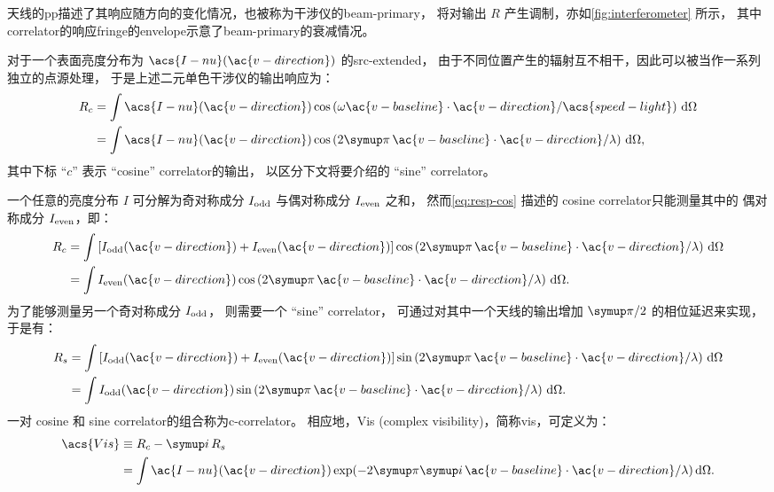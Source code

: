 天线的\ac{pp}描述了其响应随方向的变化情况，也被称为干涉仪的\acf{beam-primary}，
将对输出 $R$ 产生调制，亦如\autoref{fig:interferometer} 所示，
其中\ac{correlator}的响应\ac{fringe}的\ac{envelope}示意了\ac{beam-primary}的衰减情况。

对于一个表面亮度分布为 $\acs{I-nu}(\ac{v-direction})$ 的\ac{src-extended}，
由于不同位置产生的辐射互不相干，因此可以被当作一系列独立的点源处理，
于是上述二元单色干涉仪的输出响应为：
\begin{align}
  R_c & = \int \acs{I-nu}(\ac{v-direction})
      \cos \left( \omega \ac{v-baseline} \cdot \ac{v-direction} /
        \acs{speed-light} \right)
      \,\D{\Omega}  \\
    & = \int \acs{I-nu}(\ac{v-direction}) \cos \left(
        2\Cpi\, \ac{v-baseline} \cdot \ac{v-direction} / \lambda \right)
      \,\D{\Omega} ,
    \label{eq:resp-cos}
\end{align}
其中下标 \enquote{$c$} 表示 \enquote{cosine} \ac{correlator}的输出，
以区分下文将要介绍的 \enquote{sine} \ac{correlator}。

一个任意的亮度分布 $I$ 可分解为奇对称成分 $I_{\mathrm{odd}}$
与偶对称成分 $I_{\mathrm{even}}$ 之和，
然而\autoref{eq:resp-cos} 描述的 cosine \ac{correlator}只能测量其中的
偶对称成分 $I_{\mathrm{even}}$，即：
\begin{align}
  R_c & = \int \left[ I_{\R{odd}}(\ac{v-direction}) +
        I_{\R{even}}(\ac{v-direction}) \right]
      \cos \left( 2\Cpi\, \ac{v-baseline} \cdot \ac{v-direction} /
        \lambda \right)
      \,\D{\Omega}  \\
    & = \int I_{\R{even}}(\ac{v-direction}) \cos \left(
        2\Cpi\, \ac{v-baseline} \cdot \ac{v-direction} / \lambda \right)
      \,\D{\Omega} .
\end{align}
为了能够测量另一个奇对称成分 $I_{\mathrm{odd}}$，
则需要一个 \enquote{sine} \ac{correlator}，
可通过对其中一个天线的输出增加 $\Cpi/2$ 的相位延迟来实现，于是有：
\begin{align}
  R_s & = \int \left[ I_{\R{odd}}(\ac{v-direction}) +
        I_{\R{even}}(\ac{v-direction}) \right]
      \sin \left( 2\Cpi\, \ac{v-baseline} \cdot \ac{v-direction} /
        \lambda \right)
      \,\D{\Omega}  \\
    & = \int I_{\R{odd}}(\ac{v-direction}) \sin \left(
        2\Cpi\, \ac{v-baseline} \cdot \ac{v-direction} / \lambda \right)
      \,\D{\Omega} .
\end{align}
一对 cosine 和 sine \ac{correlator}的组合称为\ac{c-correlator}。
相应地，\acl{Vis} (complex visibility)，简称\ac{vis}，可定义为：
\begin{align}
  \acs{Vis}
    & \equiv R_c - \Ci\, R_s  \\
    & = \int \ac{I-nu}(\ac{v-direction}) \exp
      (-2\Cpi\Ci\, \ac{v-baseline} \cdot \ac{v-direction} / \lambda)
      \,\D{\Omega} .
    \label{eq:vis}
\end{align}

